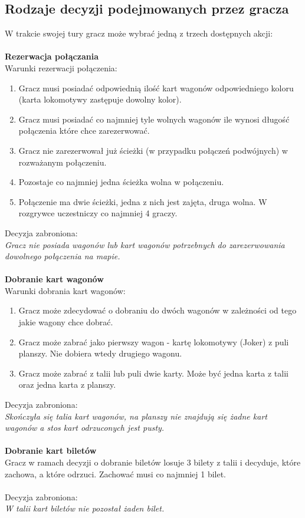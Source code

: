 \documentclass[12pt, oneside]{report}
\begin{document}
\subsection{Rodzaje decyzji podejmowanych przez gracza}
W trakcie swojej tury gracz może wybrać jedną z trzech dostępnych akcji: \\ \\
\textbf{Rezerwacja połączania} \\
Warunki rezerwacji połączenia:
\begin{enumerate}
	\item Gracz musi posiadać odpowiednią ilość kart wagonów odpowiedniego koloru (karta lokomotywy zastępuje dowolny kolor).
	\item Gracz musi posiadać co najmniej tyle wolnych wagonów ile wynosi długość połączenia które chce zarezerwować.
	\item Gracz nie zarezerwował już ścieżki (w przypadku połączeń podwójnych) w rozważanym połączeniu.
	\item Pozostaje co najmniej jedna ścieżka wolna w połączeniu.
	\item Połączenie ma dwie ścieżki, jedna z nich jest zajęta, druga wolna. W rozgrywce uczestniczy co najmniej 4 graczy.
\end{enumerate}
Decyzja zabroniona: \\
\textit{Gracz nie posiada wagonów lub kart wagonów potrzebnych do zarezerwowania dowolnego połączenia na mapie.} \\ \\
\textbf{Dobranie kart wagonów} \\
Warunki dobrania kart wagonów:
\begin{enumerate}
	\item Gracz może zdecydować o dobraniu do dwóch wagonów w zależności od tego jakie wagony chce dobrać. 
	\item Gracz może zabrać jako pierwszy wagon - kartę lokomotywy (Joker) z puli planszy. Nie dobiera wtedy drugiego wagonu.
	\item Gracz może zabrać z talii lub puli dwie karty. Może być jedna karta z talii oraz jedna karta z planszy.
\end{enumerate}
 Decyzja zabroniona: \\
 \textit{Skończyła się talia kart wagonów, na planszy nie znajdują się żadne kart wagonów a stos kart odrzuconych jest pusty.} \\ \\
\textbf{Dobranie kart biletów} \\
Gracz w ramach decyzji o dobranie biletów losuje 3 bilety z talii i decyduje, które zachowa, a które odrzuci. Zachować musi co najmniej 1 bilet. \\ \\
Decyzja zabroniona:\\
\textit{W talii kart biletów nie pozostał żaden bilet.}
\end{document}
